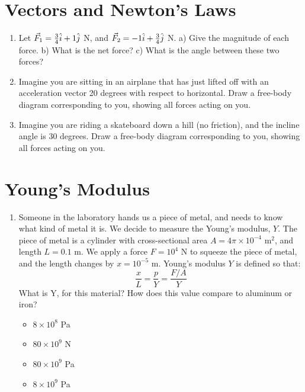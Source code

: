 \documentclass[10pt]{article}
\begin{document}
\maketitle

\section{Vectors and Newton's Laws}
\begin{enumerate}
\item Let $\vec{F}_{\rm 1} = \frac{3}{4}\hat{i} + 1\hat{j}$ N, and $\vec{F}_{\rm 2} = -1\hat{i} + \frac{3}{4}\hat{j}$ N.  a) Give the magnitude of each force.  b) What is the net force?  c) What is the angle between these two forces? \vspace{2.0 cm}
\item Imagine you are sitting in an airplane that has just lifted off with an acceleration vector 20 degrees with respect to horizontal.  Draw a free-body diagram corresponding to you, showing all forces acting on you.
\vspace{2.0 cm}
\item Imagine you are riding a skateboard down a hill (no friction), and the incline angle is 30 degrees.  Draw a free-body diagram corresponding to you, showing all forces acting on you.
\vspace{2.0 cm}
\end{enumerate}
\section{Young's Modulus}
\begin{enumerate}
\item Someone in the laboratory hands us a piece of metal, and needs to know what kind of metal it is.  We decide to measure the Young's modulus, $Y$.  The piece of metal is a cylinder with cross-sectional area $A = 4\pi \times 10^{-4}$ m$^2$, and length $L = 0.1$ m.  We apply a force $F=10^4$ N to squeeze the piece of metal, and the length changes by $x = 10^{-5}$ m.  Young's modulus $Y$ is defined so that:
\begin{equation}
\frac{x}{L} = \frac{p}{Y} = \frac{F/A}{Y}
\end{equation}
What is Y, for this material?  How does this value compare to aluminum or iron?
\begin{itemize}
\item $8 \times 10^{8}$ Pa
\item $80 \times 10^{9}$ N
\item $80 \times 10^{9}$ Pa
\item $8 \times 10^{9}$ Pa
\end{itemize}
\end{enumerate}
\clearpage
\end{document}

